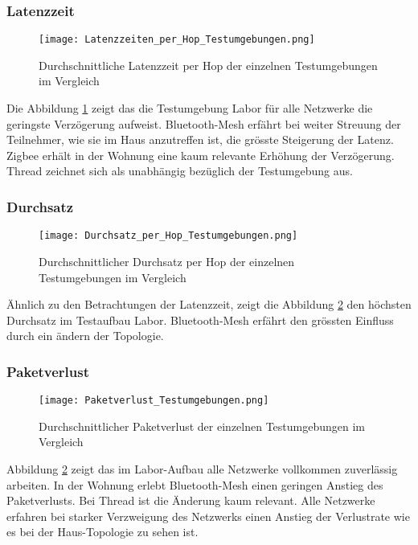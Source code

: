 \subsubsection{Latenzzeit}\label{subsec:VergleichLatenzzeitTestumgebungen}
\begin{figure}[H]
	\centering
	\texttt{[image: Latenzzeiten\_per\_Hop\_Testumgebungen.png]}
	\caption{Durchschnittliche Latenzzeit per Hop der einzelnen Testumgebungen im Vergleich}\label{fig:Latenzzeiten_per_Hop_Testumgebungen}
\end{figure}

Die Abbildung \ref{fig:Latenzzeiten_per_Hop_Testumgebungen} zeigt das die Testumgebung Labor für alle Netzwerke die geringste Verzögerung aufweist. Bluetooth-Mesh erfährt bei weiter Streuung der Teilnehmer, wie sie im Haus anzutreffen ist, die grösste Steigerung der Latenz. Zigbee erhält in der Wohnung eine kaum relevante Erhöhung der Verzögerung. Thread zeichnet sich als unabhängig bezüglich der Testumgebung aus. 

\subsubsection{Durchsatz}\label{subsec:VergleichDurchsatzTestumgebungen}
\begin{figure}[H]
	\centering
	\texttt{[image: Durchsatz\_per\_Hop\_Testumgebungen.png]}
	\caption{Durchschnittlicher Durchsatz per Hop der einzelnen Testumgebungen im Vergleich}\label{fig:Durchsätze_per_Hop_Testumgebungen}
\end{figure}

Ähnlich zu den Betrachtungen der Latenzzeit, zeigt die Abbildung \ref{fig:Durchsätze_per_Hop_Testumgebungen} den höchsten Durchsatz im Testaufbau Labor. Bluetooth-Mesh erfährt den grössten Einfluss durch ein ändern der Topologie. 

\subsubsection{Paketverlust}\label{subsec:VergleichPaketverlustTestumgebungen}
\begin{figure}[H]
	\centering
	\texttt{[image: Paketverlust\_Testumgebungen.png]}
	\caption{Durchschnittlicher Paketverlust der einzelnen Testumgebungen im Vergleich}\label{fig:PaketverlusteTestumgebungen}
\end{figure}

Abbildung \ref{fig:Durchsätze_per_Hop_Testumgebungen} zeigt das im Labor-Aufbau alle Netzwerke vollkommen zuverlässig arbeiten. In der Wohnung erlebt Bluetooth-Mesh einen geringen Anstieg des Paketverlusts. Bei Thread ist die Änderung kaum relevant. Alle Netzwerke erfahren bei starker Verzweigung des Netzwerks einen Anstieg der Verlustrate wie es bei der Haus-Topologie zu sehen ist. 

